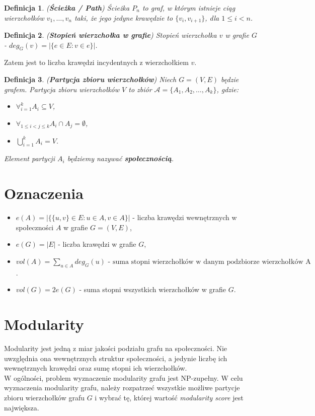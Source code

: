 \documentclass[letterpaper,12pt]{article}
\newtheorem{definition}{Definicja}
\begin{document}
  \begin{definition}
    (\textbf{Ścieżka / Path}) Ścieżka \(P_n\) to graf, w którym istnieje ciąg wierzchołków \(v_1, \ldots, v_n\) taki, że jego jedyne krawędzie to \(\{v_i, v_{i+1}\}\), dla \(1 \leq i < n\).
  \end{definition}

  \begin{definition}
    (\textbf{Stopień wierzchołka w grafie}) Stopień wierzchołka \(v\) w grafie \(G\) - \(deg_G(v) = |\{e \in E : v \in e\}|\).
  \end{definition}
  Zatem jest to liczba krawędzi incydentnych z wierzchołkiem \(v\).\\

  \begin{definition}
    (\textbf{Partycja zbioru wierzchołków}) Niech \(G = (V, E)\) będzie grafem. Partycja zbioru wierzchołków \(V\) to zbiór \(\mathcal{A} = \{A_1, A_2, \ldots, A_k\}\), gdzie:
    \begin{itemize}
      \item \(\forall_{i=1}^k A_i \subseteq V\),
      \item \(\forall_{1 \leq i < j \leq k} A_i \cap A_j = \emptyset\),
      \item \(\bigcup_{i=1}^{k} A_i = V\).
    \end{itemize}
    Element partycji \(A_i\) będziemy nazywać \textbf{społecznością}.
  \end{definition}

\section{Oznaczenia}
  \begin{itemize}
    \item \(e(A) = |\{ \{u, v\} \in E : u \in A, v \in A\}|\) - liczba krawędzi wewnętrznych w społeczności \(A\) w grafie \(G=(V,E)\),
    \item \(e(G) = |E|\) - liczba krawędzi w grafie \(G\),
    \item \(vol(A) = \sum_{u \in A}deg_G(u) \text{ - suma stopni wierzchołków w danym podzbiorze wierzchołków A}\).
    \item \(vol(G) = 2e(G)\) - suma stopni wszystkich wierzchołków w grafie \(G\).
  \end{itemize}

\section{Modularity}
  Modularity jest jedną z miar jakości podziału grafu na społeczności. Nie uwzględnia ona wewnętrznych struktur społeczności, a jedynie liczbę ich wewnętrznych krawędzi oraz sumę stopni ich wierzchołków.\\
  W ogólności, problem wyznaczenie modularity grafu jest NP-zupełny.
  W celu wyznaczenia modularity grafu, należy rozpatrzeć wszystkie możliwe partycje zbioru wierzchołków grafu \(G\) i wybrać tę, której wartość \textit{modularity score} jest największa.\\
\end{document}
